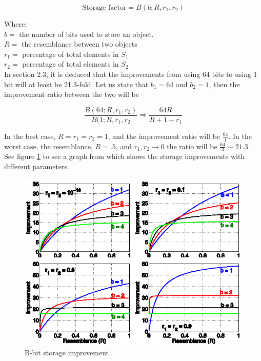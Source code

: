 \documentclass[a4paper,11pt]{article}
\begin{document}
\begin{equation}
    \text {Storage factor} = B(b;R,r_1,r_2)
    \label{eq:storagefactor}
\end{equation}

Where:\\
$b = $ the number of bits used to store an object. \\
$R = $ the resemblance between two objects \\
$r_1 = $ percentage of total elements in $S_1$ \\
$r_2 = $ percentage of total elements in $S_2$ \\

In \cite{article:bbit} section 2.3, it is deduced that the improvements from using 64 bits to using 1 bit will at least be 21.3-fold. Let us state that $b_1 = 64$ and $b_2 = 1$, then the improvement ratio between the two will be

\begin{equation}
    \frac{B(64;R,r_1,r_2)}{B(1;R,r_1,r_2} \Rightarrow \frac{64 R}{R + 1 - r_1}
    \label{eq:improvementratio}
\end{equation}

In the best case, $R = r_1 = r_2 = 1$, and the improvement ratio will be $\frac{64}{1}$. In the worst case, the resemblance, $R=.5$, and $r_1, r_2 \rightarrow 0$ the ratio will be $\frac{64}{3} \sim 21.3$. See figure \ref{fig:bbit} to see a graph from \cite{article:bbit} which shows the storage improvements with different parameters. \\


\begin{figure}[H]
    \begin{center}
        \includegraphics{plots/bbit/bbit.eps}
        \caption{B-bit storage improvement}
        \label{fig:bbit}
    \end{center}
\end{figure}
\end{document}
